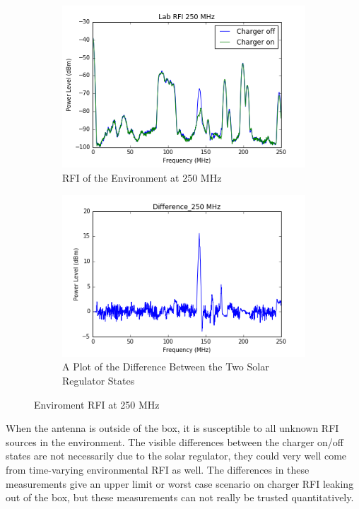 \documentclass[12pt,a4paper]{report}
\begin{document}
\begin{figure}[!htb]
	\centering
	\begin{subfigure}{.5\textwidth}
		\centering
		\includegraphics[width=.9\linewidth]{Figures/lab_rfi_charger_on_off_250MHz.png}
		\caption{RFI of the Environment at 250 MHz}
		\label{Fig:2501}
	\end{subfigure}%
	\begin{subfigure}{.5\textwidth}
		\centering
		\includegraphics[width=.9\linewidth]{Figures/Difference_250mhz.png}
		\caption{A Plot of the Difference Between the Two Solar Regulator States}
		\label{Fig:dif2501}
	\end{subfigure}
	\caption{Enviroment RFI at 250 MHz}
	\label{Fig:5}
\end{figure}

When the antenna is outside of the box, it is susceptible to all unknown RFI sources in the environment. The visible differences between the charger on/off states are not necessarily due to the solar regulator, they could very well come from time-varying environmental RFI as well. The differences in these measurements give an upper limit or
worst case scenario on charger RFI leaking out of the box, but these measurements can not really be trusted  quantitatively.
	
\end{document}

